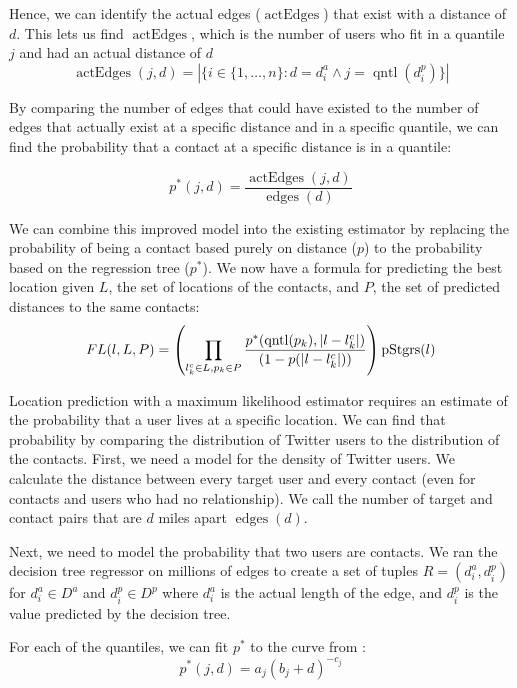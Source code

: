 \documentclass[letterpaper]{article}
\DeclareMathOperator{\pStrangers}{pStgrs}
\DeclareMathOperator{\edges}{edges}
\DeclareMathOperator{\actEdges}{actEdges}
\DeclareMathOperator{\quantile}{qntl}
\begin{document}
Hence, we can identify the actual edges ($\actEdges$) that exist with a distance of $d$.
%
This lets us find $\actEdges$, which is the number of users who fit in a quantile $j$ and had an actual distance of $d$
\[
    \actEdges(j,d) = |\{
            i \in \{1,\dots,n\} :
            d=d^a_i \wedge j=\quantile(d^p_i)
        \}|
\]

By comparing the number of edges that could have existed to the number of edges
that actually exist at a specific distance and in a specific quantile, we can
find the probability that a contact at a specific distance is in a quantile:

\[
p^*(j,d) = \frac{\actEdges(j,d)}{\edges(d)}
\]

We can combine this improved model into the existing estimator by
replacing the probability of being a contact based purely on distance ($p$) to
the probability based on the regression tree ($p^*$).
%
We now have a formula for predicting the best location given $L$, the set of
locations of the contacts, and $P$, the set of predicted distances to the same
contacts:
\[
    FL(l,L,P) =
        \left(
            \prod_{l^c_k \in L,p_k \in P}
            {p^*(\quantile(p_k),|l-l^c_k|) \over (1-p(|l-l^c_k|))}
        \right)
        \pStrangers(l)
\]

Location prediction with a maximum likelihood estimator requires an estimate of
the probability that a user lives at a specific location.
%
We can find that probability by comparing the distribution of Twitter users to
the distribution of the contacts.
%
First, we need a model for the density of Twitter users.
%
We calculate the distance between every target user and every contact (even for
contacts and users who had no relationship).
%
We call the number of target and contact pairs that are $d$ miles apart
$\edges(d)$.


Next, we need to model the probability that two users are contacts.
%
We ran the decision tree regressor on millions of edges to create a set of
tuples $R = (d^a_i, d^p_i)$ for $d^a_i \in D^a$ and $d^p_i \in D^p$ where
$d^a_i$ is the actual length of the edge, and $d^p_i$ is the value predicted by
the decision tree.

For each of the quantiles, we can fit $p^*$ to the curve from
\cite{backstrom2010find}:
\[
    p^*(j,d) = a_{j} (b_{j}+d)^{-c_{j}}
\]
\end{document}
